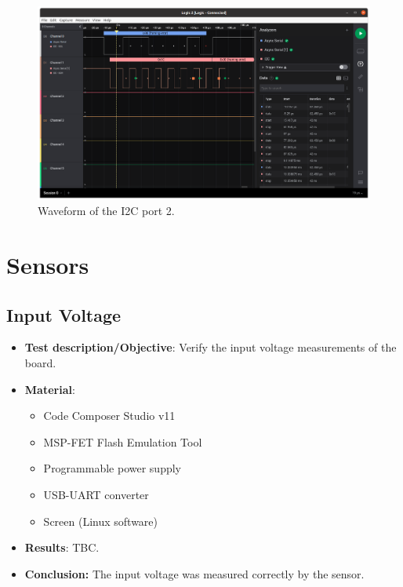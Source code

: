 \begin{figure}[!ht]
    \begin{center}
        \includegraphics[width=\columnwidth]{figures/v07/obdh2-ant-i2c.png}
        \caption{Waveform of the I2C port 2.}
        \label{fig:v07-test-i2c-2}
    \end{center}
\end{figure}

\section{Sensors}

\subsection{Input Voltage}

\begin{itemize}
    \item \textbf{Test description/Objective}: Verify the input voltage measurements of the board.
    \item \textbf{Material}:
        \begin{itemize}
            \item Code Composer Studio v11
            \item MSP-FET Flash Emulation Tool
            \item Programmable power supply
            \item USB-UART converter
            \item Screen (Linux software)
        \end{itemize}
    \item \textbf{Results}: TBC.
    \item \textbf{Conclusion:} The input voltage was measured correctly by the sensor.
\end{itemize}

